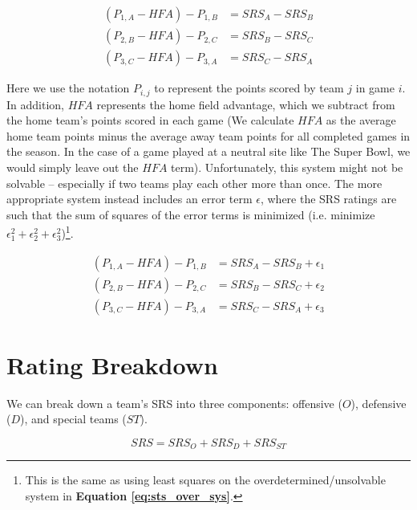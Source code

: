 \documentclass{report}
\begin{document}
\begin{equation}\label{eq:sts_over_sys}
    \begin{aligned}
        (P_{1,A} - HFA) - P_{1,B} &= SRS_A - SRS_B \\
        (P_{2,B} - HFA) - P_{2,C} &= SRS_B - SRS_C \\
        (P_{3,C} - HFA) - P_{3,A} &= SRS_C - SRS_A
    \end{aligned}
\end{equation}

Here we use the notation $P_{i,j}$ to represent the points scored by team $j$ in game $i$.
In addition, $HFA$ represents the home field advantage, which we subtract from the home team's points scored in each game
(We calculate $HFA$ as the average home team points minus the average away team points for all completed games in the season.
In the case of a game played at a neutral site like The Super Bowl, we would simply leave out the $HFA$ term).
Unfortunately, this system might not be solvable -- especially if two teams play each other more than once.
The more appropriate system instead includes an error term $\epsilon$, where the SRS ratings are such that the sum of squares of the error terms is minimized (i.e. minimize $\epsilon_1^2+\epsilon_2^2+\epsilon_3^2$)\footnote{
    This is the same as using least squares on the overdetermined/unsolvable system in \textbf{Equation \ref{eq:sts_over_sys}}.
}.

\begin{equation}\label{eq:sts_over_sys_ep}
    \begin{aligned}
        (P_{1,A} - HFA) - P_{1,B} &= SRS_A - SRS_B + \epsilon_1 \\
        (P_{2,B} - HFA) - P_{2,C} &= SRS_B - SRS_C + \epsilon_2 \\
        (P_{3,C} - HFA) - P_{3,A} &= SRS_C - SRS_A + \epsilon_3
    \end{aligned}
\end{equation}

\section{Rating Breakdown}

We can break down a team's SRS into three components: offensive ($O$), defensive ($D$), and special teams ($ST$).

\begin{equation}
    SRS = SRS_O + SRS_D + SRS_{ST}
\end{equation}
\end{document}
